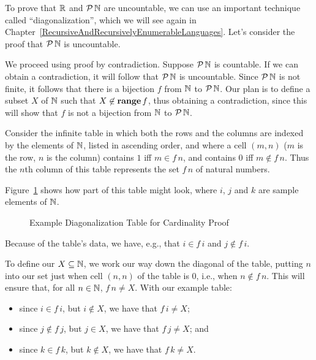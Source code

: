 To prove that $\mathbb{R}$ and ${\cal P} \,\mathbb{N}$ are uncountable, we can
use an important technique called ``diagonalization'',
%
which we will see again in
Chapter~\ref{RecursiveAndRecursivelyEnumerableLanguages}.  Let's consider
the proof that ${\cal P} \,\mathbb{N}$ is uncountable.

We proceed using proof by contradiction.
%
%
Suppose ${\cal P} \,\mathbb{N}$ is countable.  If we can obtain a
contradiction, it will follow that ${\cal P} \,\mathbb{N}$ is uncountable.
Since ${\cal P} \,\mathbb{N}$ is not finite, it follows that there is a
bijection $f$ from $\mathbb{N}$ to ${\cal P} \,\mathbb{N}$.  Our plan is to define
a subset $X$ of $\mathbb{N}$ such that $X\not\in\mathbf{range}\,f$, thus obtaining
a contradiction, since this will show that $f$ is not a bijection from
$\mathbb{N}$ to ${\cal P} \,\mathbb{N}$.

Consider the infinite table in which both the rows and the columns are
indexed by the elements of $\mathbb{N}$, listed in ascending order, and
where a cell $(m, n)$ ($m$ is the row, $n$ is the column) contains
$1$ iff $m\in f\,n$, and contains $0$ iff $m\not\in f\,n$.  Thus the
$n$th column of this table represents the set $f\,n$ of natural
numbers.

Figure~\ref{DiagCard} shows how part of this table might look, where
$i$, $j$ and $k$ are sample elements of $\mathbb{N}$.
\begin{figure}
\begin{center}

\end{center}
\caption{Example Diagonalization Table for Cardinality Proof}
\label{DiagCard}
\end{figure}
Because of the table's data, we have, e.g., that $i\in f\,i$
and $j\not\in f\,i$.

To define our $X\subseteq\mathbb{N}$, we work our way down the diagonal of the
table, putting $n$ into our set just when cell $(n,n)$ of the
table is $0$, i.e., when $n\not\in f\,n$.  This will ensure that, for
all $n\in\mathbb{N}$, $f\,n\neq X$.
With our example table:
\begin{itemize}
\item since $i\in f\,i$, but $i\not\in X$, we have that $f\,i\neq X$;

\item since $j\not\in f\,j$, but $j\in X$, we have that $f\,j\neq X$; and

\item since $k\in f\,k$, but $k\not\in X$, we have that $f\,k\neq X$.
\end{itemize}

